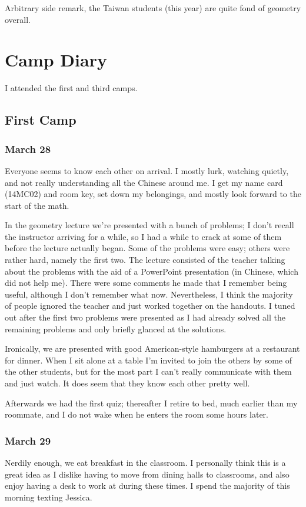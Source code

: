 \documentclass[11pt]{scrreprt}
\begin{document}
Arbitrary side remark, the Taiwan students (this year) are quite fond of geometry overall.


\chapter{Camp Diary}
I attended the first and third camps.

\section{First Camp}
\subsection{March 28}
Everyone seems to know each other on arrival. I mostly lurk, watching quietly, and not really understanding all the Chinese around me. I get my name card (14MC02) and room key, set down my belongings, and mostly look forward to the start of the math.

In the geometry lecture we're presented with a bunch of problems; I don't recall the instructor arriving for a while, so I had a while to crack at some of them before the lecture actually began. Some of the problems were easy; others were rather hard, namely the first two. The lecture consisted of the teacher talking about the problems with the aid of a PowerPoint presentation (in Chinese, which did not help me). There were some comments he made that I remember being useful, although I don't remember what now. Nevertheless, I think the majority of people ignored the teacher and just worked together on the handouts. I tuned out after the first two problems were presented as I had already solved all the remaining problems and only briefly glanced at the solutions.

Ironically, we are presented with good American-style hamburgers at a restaurant for dinner. When I sit alone at a table I'm invited to join the others by some of the other students, but for the most part I can't really communicate with them and just watch. It does seem that they know each other pretty well.

Afterwards we had the first quiz; thereafter I retire to bed, much earlier than my roommate, and I do not wake when he enters the room some hours later.

\subsection{March 29}
Nerdily enough, we eat breakfast in the classroom. I personally think this is a great idea as I dislike having to move from dining halls to classrooms, and also enjoy having a desk to work at during these times. I spend the majority of this morning texting Jessica.
\end{document}
